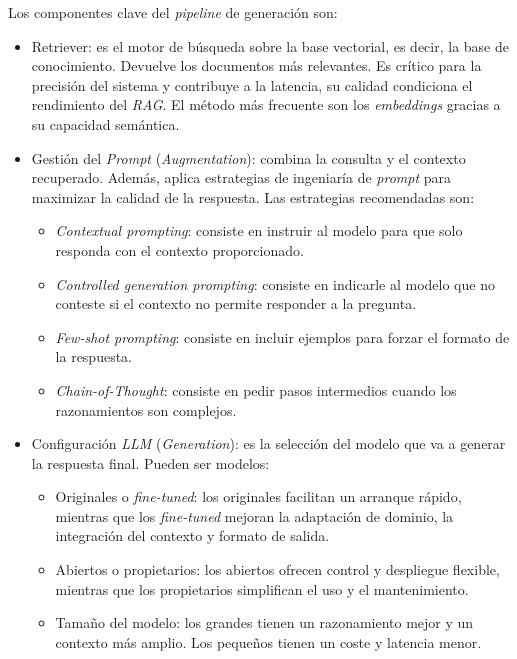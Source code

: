 Los componentes clave del \textit{pipeline} de generación son:
\begin{itemize}
\tightlist
	\item Retriever: es el motor de búsqueda sobre la base vectorial, es decir, la base de conocimiento. Devuelve los documentos más relevantes. Es crítico para la precisión del sistema y contribuye a la latencia, su calidad condiciona el rendimiento del \textit{RAG}. El método más frecuente son los \textit{embeddings} gracias a su capacidad semántica.
	\item Gestión del \textit{Prompt} (\textit{Augmentation}): combina la consulta y el contexto recuperado. Además, aplica estrategias de ingeniaría de \textit{prompt} para maximizar la calidad de la respuesta. Las estrategias recomendadas son:
	\begin{itemize}
	\tightlist
		\item \textit{Contextual prompting}: consiste en instruir al modelo para que solo responda con el contexto proporcionado.
		\item \textit{Controlled generation prompting}: consiste en indicarle al modelo que no conteste si el contexto no permite responder a la pregunta.
		\item \textit{Few-shot prompting}: consiste en incluir ejemplos para forzar el formato de la respuesta.
		\item \textit{Chain-of-Thought}: consiste en pedir pasos intermedios cuando los razonamientos son complejos.
	\end{itemize}
	\item Configuración \textit{LLM} (\textit{Generation}): es la selección del modelo que va a generar la respuesta final. Pueden ser modelos:
	\begin{itemize}
	\tightlist
		\item Originales o \textit{fine-tuned}: los originales facilitan un arranque rápido, mientras que los \textit{fine-tuned} mejoran la adaptación de dominio, la integración del contexto y formato de salida.
		\item Abiertos o propietarios: los abiertos ofrecen control y despliegue flexible, mientras que los propietarios simplifican el uso y el mantenimiento.
		\item Tamaño del modelo: los grandes tienen un razonamiento mejor y un contexto más amplio. Los pequeños tienen un coste y latencia menor.
	\end{itemize}
\end{itemize} 

